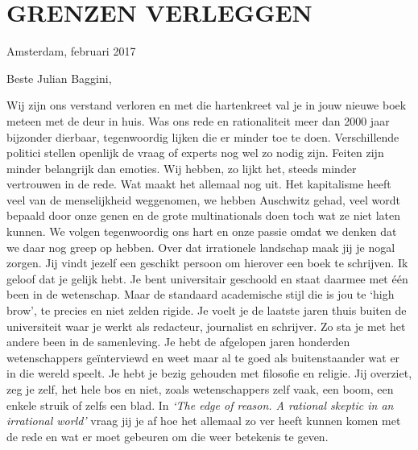 \documentclass[]{book}
\begin{document}
\hypertarget{grenzen-verleggen}{%
\chapter*{GRENZEN VERLEGGEN}\label{grenzen-verleggen}}

Amsterdam, februari 2017

Beste Julian Baggini,

Wij zijn ons verstand verloren en met die hartenkreet val je in jouw
nieuwe boek meteen met de deur in huis. Was ons rede en rationaliteit
meer dan 2000 jaar bijzonder dierbaar, tegenwoordig lijken die er minder
toe te doen. Verschillende politici stellen openlijk de vraag of experts
nog wel zo nodig zijn. Feiten zijn minder belangrijk dan emoties. Wij
hebben, zo lijkt het, steeds minder vertrouwen in de rede. Wat maakt het
allemaal nog uit. Het kapitalisme heeft veel van de menselijkheid
weggenomen, we hebben Auschwitz gehad, veel wordt bepaald door onze
genen en de grote multinationals doen toch wat ze niet laten kunnen. We
volgen tegenwoordig ons hart en onze passie omdat we denken dat we daar
nog greep op hebben. Over dat irrationele landschap maak jij je nogal
zorgen. Jij vindt jezelf een geschikt persoon om hierover een boek te
schrijven. Ik geloof dat je gelijk hebt. Je bent universitair geschoold
en staat daarmee met één been in de wetenschap. Maar de standaard
academische stijl die is jou te `high brow', te precies en niet zelden
rigide. Je voelt je de laatste jaren thuis buiten de universiteit waar
je werkt als redacteur, journalist en schrijver. Zo sta je met het
andere been in de samenleving. Je hebt de afgelopen jaren honderden
wetenschappers geïnterviewd en weet maar al te goed als buitenstaander
wat er in die wereld speelt. Je hebt je bezig gehouden met filosofie en
religie. Jij overziet, zeg je zelf, het hele bos en niet, zoals
wetenschappers zelf vaak, een boom, een enkele struik of zelfs een blad.
In \emph{`The edge of reason. A rational skeptic in an irrational
world'} vraag jij je af hoe het allemaal zo ver heeft kunnen komen met
de rede en wat er moet gebeuren om die weer betekenis te geven.
\end{document}
